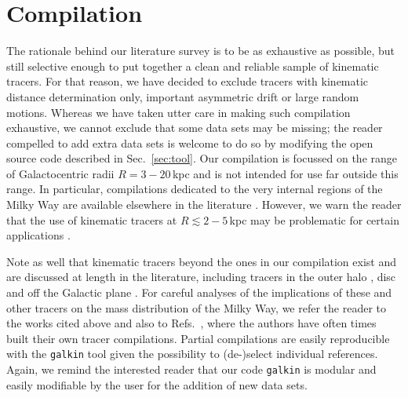\documentclass[twocolumn,prd,reprint,preprintnumbers,amsmath,amssymb,superscriptaddress,nofootinbib]{revtex4}
\begin{document}
\section{Compilation}\label{sec:comp}
\par The rationale behind our literature survey is to be as exhaustive as possible, but still selective enough to put together a clean and reliable sample of kinematic tracers. For that reason, we have decided to exclude tracers with kinematic distance determination only, important asymmetric drift or large random motions. Whereas we have taken utter care in making such compilation exhaustive, we cannot exclude that some data sets may be missing; the reader compelled to add extra data sets is welcome to do so by modifying the open source code described in Sec.~\ref{sec:tool}. Our compilation is focussed on the range of Galactocentric radii $R=3-20\,$kpc and is not intended for use far outside this range. In particular, compilations dedicated to the very internal regions of the Milky Way are available elsewhere in the literature \cite{Sofue:2013kja}. However, we warn the reader that the use of kinematic tracers at $R \lesssim 2-5\,$kpc may be problematic for certain applications \cite{2015A&A...578A..14C}.

\par Note as well that kinematic tracers beyond the ones in our compilation exist and are discussed at length in the literature, including tracers in the outer halo \cite{2006MNRAS.369.1688D,2008ApJ...684.1143X,2012ApJ...761...98K,Bhattacharjee2014,2014ApJ...794...59K}, disc \cite{Bovy2012,Bovy:2013raa,2014ApJ...794..151L,2003A&A...397..133R} and off the Galactic plane \cite{1991ApJ...367L...9K,2004MNRAS.352..440H,2012ApJ...751...30M,2012ApJ...756...89B,2015A&A...573A..91M}. For careful analyses of the implications of these and other tracers on the mass distribution of the Milky Way, we refer the reader to the works cited above and also to Refs.~\cite{2011MNRAS.416.2318G,2012ApJ...746..181S, 2012MNRAS.425.1445G, 2013ApJ...772..108Z, Read2014,DehnenBinney1998, 2009PASJ...61..227S, CatenaUllio2010, 2010A&A...509A..25W, 2010A&A...523A..83S, 2011JCAP...11..029I, 2011MNRAS.414.2446M, 2013JCAP...07..016N, 2015arXiv150405368S}, where the authors have often times built their own tracer compilations. 
Partial compilations are easily reproducible with the \texttt{galkin} tool given the possibility to (de-)select individual references. 
Again, we remind the interested reader that our code \texttt{galkin} is modular and easily modifiable by the user for the addition of new data sets.
\end{document}
